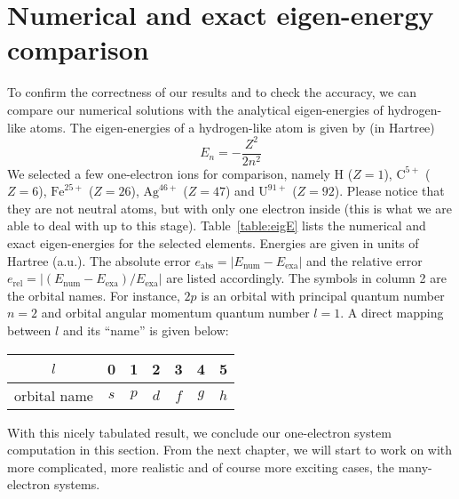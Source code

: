 \section{Numerical and exact eigen-energy comparison}
To confirm the correctness of our results and to check the accuracy, we can
compare our numerical solutions with the analytical eigen-energies of hydrogen-like
atoms. The eigen-energies of a hydrogen-like atom is given by (in Hartree)
\begin{equation} \label{eq:eigE}
E_n = -\frac{Z^2}{2n^2}
\end{equation}
%
We selected a few one-electron ions for comparison, namely H ($Z=1$), $\text{C}^{5+}$ ($Z=6$),
$\text{Fe}^{25+}$ ($Z=26$), $\text{Ag}^{46+}$ ($Z=47$) and $\text{U}^{91+}$ ($Z=92$).
Please notice that they are not neutral atoms, but with only one electron inside
(this is what we are able to deal with up to this stage). Table~\ref{table:eigE} lists the numerical
and exact eigen-energies for the selected elements. Energies are given in
units of Hartree (a.u.). The absolute error $e_{\text{abs}} = |E_{\text{num}} - E_{\text{exa}}|$
and the relative error $e_{\text{rel}} = |(E_{\text{num}} - E_{\text{exa}})/E_{\text{exa}}|$
are listed accordingly. The symbols in column 2 are the orbital names. For
instance, $2p$ is an orbital with principal quantum number $n=2$ and orbital angular momentum
quantum number $l=1$. A direct mapping between $l$ and its ``name'' is given below:
\begin{center}
\begin{tabular}{ c | c | c | c | c | c | c }
  \hline
  $l$          & 0 & 1 & 2 & 3 & 4 & 5 \\ \hline
  orbital name & $s$ & $p$ & $d$ & $f$ & $g$ & $h$ \\
  \hline
\end{tabular}
\end{center}

With this nicely tabulated result, we conclude our one-electron system computation
in this section. From the next chapter, we will start to work on with more
complicated, more realistic and of course more exciting cases, the many-electron systems.

